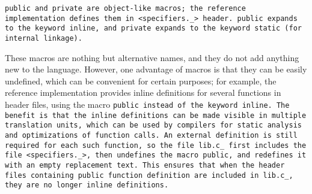 \tt{public} and \tt{private} are object-like macros;
the reference implementation defines them in \tt{<specifiers._>} header.
\tt{public}  expands to the keyword \tt{inline}, and
\tt{private} expands to the keyword \tt{static} (for internal linkage).

\note These macros are nothing but alternative names,
and they do not add anything new to the language.
However, one advantage of macros is that they can be easily undefined,
which can be convenient for certain purposes; for example, the reference
implementation provides inline definitions for several functions in header
files, using the macro \tt{public} instead of the keyword \tt{inline}.
The benefit is that the inline definitions can be made visible
in multiple translation units, which can be used by compilers
for static analysis and optimizations of function calls.
An external definition is still required for each such function, so the
file \tt{lib.c_} first includes the file \tt{<specifiers._>}, then undefines
the macro \tt{public}, and redefines it with an empty replacement text.
This ensures that when the header files containing \tt{public} function
definition are included in \tt{lib.c_}, they are no longer \tt{inline} definitions.
